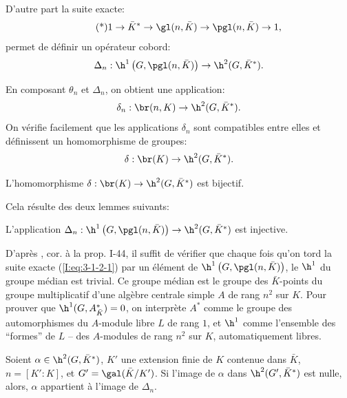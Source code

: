 D'autre part la suite exacte:
\begin{equation*}\tag{*}\label{I:eq:3-1-2-1}
  1 \to \bar K^* \to \gl(n,\bar K) \to \pgl(n,\bar K) \to 1\text{,}
\end{equation*}
permet de définir un opérateur cobord:
\[
  \Delta_n : \h^1\left(G,\pgl(n,\bar K)\right) \to \h^2(G,\bar K^*)\text{.}
\]

En composant $\theta_n$ et $\Delta_n$, on obtient une application:
\[
  \delta_n : \br(n,K) \to \h^2(G,\bar K^*)\text{.}
\]
On vérifie facilement que les applications $\delta_n$ sont compatibles entre 
elles et définissent un homomorphisme de groupes:
\[
  \delta : \br(K) \to \h^2(G,\bar K^*)\text{.}
\]





\begin{propositiondotdash}\label{I:3-1-3}
L'homomorphisme $\delta:\br(K)\to \h^2(G,\bar K^*)$ est bijectif. 
\end{propositiondotdash}

Cela résulte des deux lemmes suivants:





\begin{lemmadotdash}\label{I:3-1-4}
L'application 
$\Delta_n:\h^1\left(G,\pgl(n,\bar K)\right)\to \h^2(G,\bar K^*)$ est 
injective.
\end{lemmadotdash}

D'après , cor. à la prop. I-44, il suffit de vérifier que chaque 
fois qu'on tord la suite exacte (\ref{I:eq:3-1-2-1}) par un élément de 
$\h^1\left(G,\pgl(n,\bar K)\right)$, le $\h^1$ du groupe médian est trivial. 
Ce groupe médian est le groupe des $\bar K$-points du groupe multiplicatif 
d'une algèbre centrale simple $A$ de rang $n^2$ sur $K$. Pour prouver que 
$\h^1(G,A_{\bar K}^*) = 0$, on interprète $A^*$ comme le groupe 
des automorphismes du $A$-module libre $L$ de rang $1$, et $\h^1$ comme 
l'ensemble des ``formes'' de $L$ -- des $A$-modules de rang $n^2$ sur $K$, 
automatiquement libres. 





\begin{lemmadotdash}\label{I:3-1-5}
Soient $\alpha\in \h^2(G,\bar K^*)$, $K'$ une extension finie de $K$ 
contenue dans $\bar K$, $n=[K':K]$, et $G'=\gal(\bar K/K')$. Si l'image de 
$\alpha$ dans $\h^2(G',\bar K^*)$ est nulle, alors, $\alpha$ appartient 
à l'image de $\Delta_n$. 
\end{lemmadotdash}


